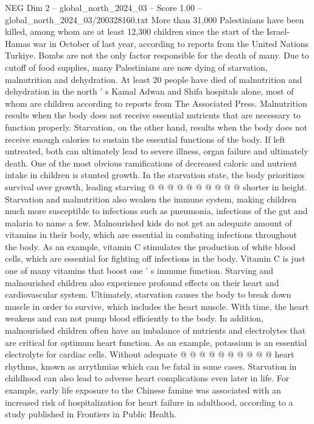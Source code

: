 \begin{textsample}{NEG Dim 2 – global\_north\_2024\_03 – Score 1.00 – global\_north\_2024\_03/200328160.txt}  \label{ex:f2_neg_081}
More than 31,000 Palestinians have been killed, among whom are at least 12,300 children since the start of the Israel-Hamas war in October of last year, according to reports from the United Nations Turkiye.
Bombs are not the only factor responsible for the death of many.
Due to cutoff of food supplies, many Palestinians are now dying of starvation, malnutrition and dehydration.
At least 20 people have died of malnutrition and dehydration in the north ' s Kamal Adwan and Shifa hospitals alone, most of whom are children according to reports from The Associated Press.
Malnutrition results when the body does not receive essential nutrients that are necessary to function properly.
Starvation, on the other hand, results when the body does not receive enough calories to sustain the essential functions of the body.
If left untreated, both can ultimately lead to severe illness, organ failure and ultimately death.
One of the most obvious ramifications of decreased caloric and nutrient intake in children is stunted growth.
In the starvation state, the body prioritizes survival over growth, leading starving @ @ @ @ @ @ @ @ @ @ shorter in height.
Starvation and malnutrition also weaken the immune system, making children much more susceptible to infections such as pneumonia, infections of the gut and malaria to name a few.
Malnourished kids do not get an adequate amount of vitamins in their body, which are essential in combating infections throughout the body.
As an example, vitamin C stimulates the production of white blood cells, which are essential for fighting off infections in the body.
Vitamin C is just one of many vitamins that boost one ' s immune function.
Starving and malnourished children also experience profound effects on their heart and cardiovascular system.
Ultimately, starvation causes the body to break down muscle in order to survive, which includes the heart muscle.
With time, the heart weakens and can not pump blood efficiently to the body.
In addition, malnourished children often have an imbalance of nutrients and electrolytes that are critical for optimum heart function.
As an example, potassium is an essential electrolyte for cardiac cells.
Without adequate @ @ @ @ @ @ @ @ @ @ heart rhythms, known as arrythmias which can be fatal in some cases.
Starvation in childhood can also lead to adverse heart complications even later in life.
For example, early life exposure to the Chinese famine was associated with an increased risk of hospitalization for heart failure in adulthood, according to a study published in Frontiers in Public Health.

\end{textsample}
